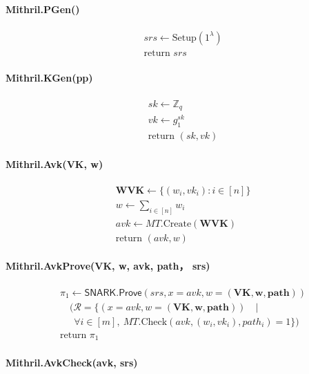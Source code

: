 \documentclass{article}
\begin{document}
\paragraph{Mithril.PGen()}
\begin{align*}
&srs \leftarrow \text{Setup}(1^\lambda)\\
&\text{return } srs 
\end{align*}

\paragraph{Mithril.KGen(pp)}
\begin{align*}
&sk \leftarrow \mathbb{Z}_q \\
&vk \leftarrow g_1^{sk} \\
&\text{return } (sk, vk)
\end{align*}

\paragraph{Mithril.Avk(\textbf{VK}, \textbf{w})}
\begin{align*}
&\textbf{WVK} \leftarrow \{(w_i, vk_i) : i \in [n]\} \\
&w \leftarrow \sum_{i \in [n]} w_i\\
&avk \leftarrow MT.\mathrm{Create}(\textbf{WVK}) \\
&\text{return } (avk,w)
\end{align*}

\paragraph{Mithril.AvkProve(VK, w, avk, path， srs)}
\begin{align*}
&\pi_1 \leftarrow \mathsf{SNARK.Prove}(srs, x = avk, w = (\textbf{VK}, \textbf{w}, \textbf{path})) \\
&\quad (\mathcal{R} = \{(x = avk, w = (\textbf{VK}, \textbf{w}, \textbf{path}))\quad |\\ & \quad \ \ \forall i \in [m],\ MT.\mathrm{Check}(avk, (w_i, vk_i), path_i) = 1 \}) \\
&\text{return } \pi_1
\end{align*}

\paragraph{Mithril.AvkCheck(avk, srs)}
\end{document}
